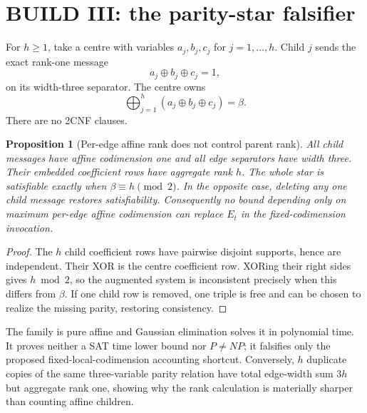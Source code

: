 \documentclass[11pt]{article}
\newtheorem{proposition}[theorem]{Proposition}
\begin{document}
\section{BUILD III: the parity-star falsifier}
For $h\ge1$, take a centre with variables
$a_j,b_j,c_j$ for $j=1,\ldots,h$.  Child $j$ sends the exact rank-one message
\[
 a_j\oplus b_j\oplus c_j=1, \tag{$P_j$}
\]
on its width-three separator.  The centre owns
\[
 \bigoplus_{j=1}^{h}(a_j\oplus b_j\oplus c_j)=\beta. \tag{$Q_\beta$}
\]
There are no 2CNF clauses.

\begin{proposition}[Per-edge affine rank does not control parent rank]
All child messages have affine codimension one and all edge separators have
width three.  Their embedded coefficient rows have aggregate rank $h$.  The
whole star is satisfiable exactly when $\beta\equiv h\pmod2$.  In the
opposite case, deleting any one child message restores satisfiability.
Consequently no bound depending only on maximum per-edge affine codimension
can replace $E_t$ in the fixed-codimension invocation.
\end{proposition}
\begin{proof}
The $h$ child coefficient rows have pairwise disjoint supports, hence are
independent.  Their XOR is the centre coefficient row.  XORing their right
sides gives $h\bmod2$, so the augmented system is inconsistent precisely
when this differs from $\beta$.  If one child row is removed, one triple is
free and can be chosen to realize the missing parity, restoring consistency.
\end{proof}

The family is pure affine and Gaussian elimination solves it in polynomial
time.  It proves neither a SAT time lower bound nor $P\ne NP$; it falsifies
only the proposed fixed-local-codimension accounting shortcut.  Conversely,
$h$ duplicate copies of the same three-variable parity relation have total
edge-width sum $3h$ but aggregate rank one, showing why the rank calculation
is materially sharper than counting affine children.
\end{document}
